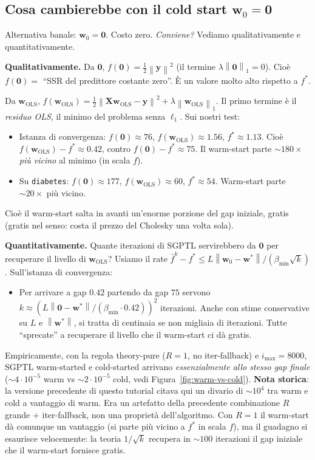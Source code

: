 \documentclass[11pt,a4paper]{article}
\newcommand{\norm}[1]{\left\|#1\right\|}
\newcommand{\bw}{\mathbf{w}}
\newcommand{\by}{\mathbf{y}}
\newcommand{\bX}{\mathbf{X}}
\newcommand{\bzero}{\mathbf{0}}
\theoremstyle{definition}
\begin{document}
\subsection{Cosa cambierebbe con il cold start $\bw_0 = \bzero$}

Alternativa banale: $\bw_0 = \bzero$. Costo zero. \emph{Conviene?} Vediamo qualitativamente e quantitativamente.

\textbf{Qualitativamente.} Da $\bzero$, $f(\bzero) = \tfrac{1}{2}\norm{\by}^2$ (il termine $\lambda\norm{\bzero}_1 = 0$). Cioè $f(\bzero) = $ ``SSR del predittore costante zero''. È un valore molto alto rispetto a $f^*$.

Da $\bw_{\text{OLS}}$, $f(\bw_{\text{OLS}}) = \tfrac{1}{2}\norm{\bX\bw_{\text{OLS}}-\by}^2 + \lambda\norm{\bw_{\text{OLS}}}_1$. Il primo termine è il \emph{residuo OLS}, il minimo del problema senza $\ell_1$. Sui nostri test:
\begin{itemize}[leftmargin=*]
\item Istanza di convergenza: $f(\bzero) \approx 76$, $f(\bw_{\text{OLS}}) \approx 1.56$, $f^*\approx 1.13$. Cioè $f(\bw_{\text{OLS}}) - f^* \approx 0.42$, contro $f(\bzero) - f^* \approx 75$. Il warm-start parte $\sim 180\times$ \emph{più vicino} al minimo (in scala $f$).
\item Su \texttt{diabetes}: $f(\bzero) \approx 177$, $f(\bw_{\text{OLS}}) \approx 60$, $f^*\approx 54$. Warm-start parte $\sim 20\times$ più vicino.
\end{itemize}
Cioè il warm-start salta in avanti un'enorme porzione del gap iniziale, gratis (gratis nel senso: costa il prezzo del Cholesky una volta sola).

\textbf{Quantitativamente.} Quante iterazioni di SGPTL servirebbero da $\bzero$ per recuperare il livello di $\bw_{\text{OLS}}$? Usiamo il rate $\bar f^k - f^* \le L\norm{\bw_0-\bw^*}/(\beta_{\min}\sqrt{k})$. Sull'istanza di convergenza:
\begin{itemize}[leftmargin=*]
\item Per arrivare a gap $0.42$ partendo da gap $75$ servono $k \approx (L\norm{\bzero-\bw^*}/(\beta_{\min}\cdot 0.42))^2$ iterazioni. Anche con stime conservative su $L$ e $\norm{\bw^*}$, si tratta di centinaia se non migliaia di iterazioni. Tutte ``sprecate'' a recuperare il livello che il warm-start ci dà gratis.
\end{itemize}
Empiricamente, con la regola theory-pure ($R=1$, no iter-fallback) e $i_{\max}=8000$, SGPTL warm-started e cold-started arrivano \emph{essenzialmente allo stesso gap finale} ($\sim 4 \cdot 10^{-5}$ warm vs $\sim 2 \cdot 10^{-5}$ cold, vedi Figura~\ref{fig:warm-vs-cold}). \textbf{Nota storica}: la versione precedente di questo tutorial citava qui un divario di $\sim 10^4$ tra warm e cold a vantaggio di warm. Era un artefatto della precedente combinazione $R$ grande $+$ iter-fallback, non una proprietà dell'algoritmo. Con $R = 1$ il warm-start dà comunque un vantaggio (si parte più vicino a $f^*$ in scala $f$), ma il guadagno si esaurisce velocemente: la teoria $1/\sqrt k$ recupera in $\sim 100$ iterazioni il gap iniziale che il warm-start fornisce gratis.
\end{document}
